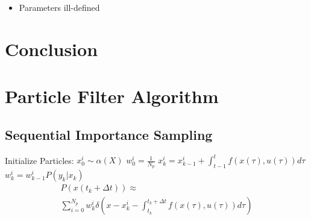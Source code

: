\documentclass[journal]{./IEEEtran}
\begin{document}
\begin{itemize}
\item Parameters ill-defined
\end{itemize}

\section{Conclusion}
\label{sec:Conclusion}


\appendices

\section{Particle Filter Algorithm}
\label{sec:algorithms}

\subsection{Sequential Importance Sampling}
\label{alg:BasicParticleFilter}
\begin{algorithm}
\begin{algorithmic}
\STATE Initialize Particles:
    \STATE $x^i_0  \sim \alpha(X)$
    \STATE $w^i_0 = \frac{1}{N_p}$
\ENDFOR
{}
        \STATE $x^i_k = x^i_{k-1} + \int_{t-1}^t f(x(\tau), u(\tau)) d\tau $
        \STATE $w^i_k = w^i_{k-1}P(y_k | x_k)$
    \ENDFOR
\ENDFOR
\begin{equation*}
\begin{array}{l}
P(x(t_k+\Delta t)) \approx \\
\sum_{i=0}^{N_p} w^i_k \delta\left(x - x^i_k - \int_{t_k}^{t_k+\Delta t} f(x(\tau), u(\tau)) d\tau \right) 
\end{array}
\end{equation*}
\end{algorithmic}
\end{algorithm}
\end{document}

